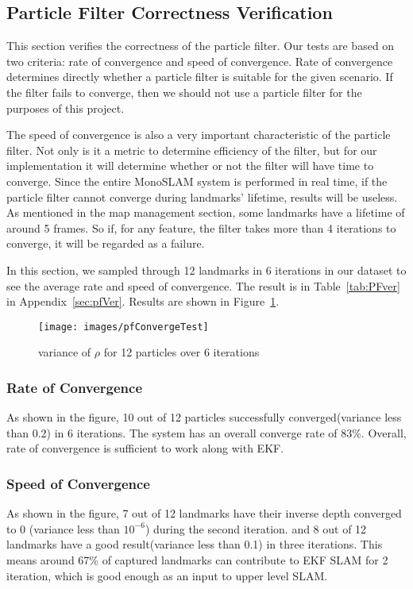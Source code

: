 \documentclass[conference]{IEEEtran}
\begin{document}
\subsection{Particle Filter Correctness Verification}
This section verifies the correctness of the particle filter. Our tests are based on two criteria: rate of convergence and speed of convergence. Rate of convergence determines directly whether a particle filter is suitable for the given scenario. If the filter fails to converge, then we should not use a particle filter for the purposes of this project. 

The speed of convergence is also a very important characteristic of the particle filter. Not only is it a metric to determine efficiency of the filter, but for our implementation it will determine whether or not the filter will have time to converge. Since the entire MonoSLAM system is performed in real time, if the particle filter cannot converge during landmarks' lifetime, results will be useless. As mentioned in the map management section, some landmarks have a lifetime of around 5 frames. So if, for any feature, the filter takes more than 4 iterations to converge, it will be regarded as a failure.

In this section, we sampled through 12 landmarks in 6 iterations in our dataset to see the average rate and speed of convergence. The result is in Table~\ref{tab:PFver} in Appendix~\ref{sec:pfVer}. Results are shown in Figure~\ref{fig:pfConvergeTest}.

\begin{figure}[h]
\centering
\texttt{[image: images/pfConvergeTest]}
\caption{variance of $\rho$ for 12 particles over 6 iterations}
\label{fig:pfConvergeTest}
\end{figure}

\subsubsection{Rate of Convergence}
As shown in the figure, 10 out of 12 particles successfully converged(variance less than 0.2) in 6 iterations. The system has an overall converge rate of 83\%. Overall, rate of convergence is sufficient to work along with EKF.


\subsubsection{Speed of Convergence}
As shown in the figure, 7 out of 12 landmarks have their inverse depth converged to 0 (variance less than $10^{-6}$) during the second iteration. and 8 out of 12 landmarks have a good result(variance less than 0.1) in three iterations. This means around 67\% of captured landmarks can contribute to EKF SLAM for 2 iteration, which is good enough as an input to upper level SLAM.
\end{document}
